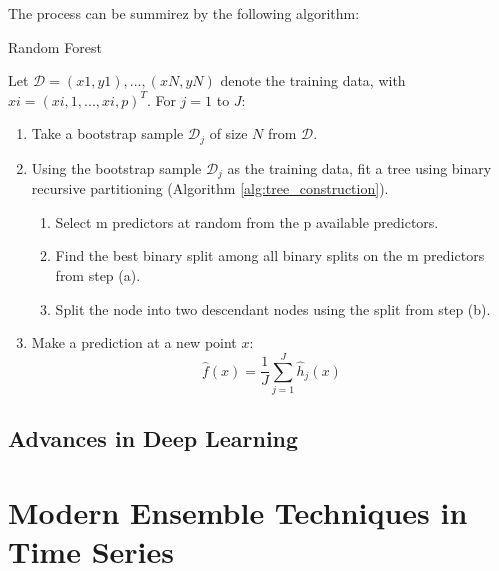 The process can be summirez by the following algorithm:
\begin{tcolorbox}[colback=blue!5, colframe=blue!80, boxrule=0pt]
    \begin{algorithm} [H]
        \caption{Random Forest}
        \label{alg:random_forest}
        Let $\mathscr{D} = {(x1, y1),...,(xN, yN)}$ denote the training data, with $xi = (xi,1,..., xi,p)^T$. 
        For $j = 1$ to $J$:
        \begin{enumerate}
            \item Take a bootstrap sample $\mathscr{D}_j$ of size $N$ from $\mathscr{D}$.
            \item Using the bootstrap sample $\mathscr{D}_j$ as the training data, fit a tree using binary recursive partitioning (Algorithm \ref{alg:tree_construction}).
            \begin{enumerate}
                \item Select m predictors at random from the p available predictors.
                \item Find the best binary split among all binary splits on the m predictors from step (a).
                \item Split the node into two descendant nodes using the split from step (b).
            \end{enumerate}
            \item Make a prediction at a new point $x$: 
            \[
                \hat{f}(x) = \frac{1}{J} \sum_{j=1}^{J} \hat{h}_j(x)
            \]
        \end{enumerate}
    \end{algorithm}
\end{tcolorbox}

\subsubsection{}


\subsection{Advances in Deep Learning} %

\section{Modern Ensemble Techniques in Time Series} %
\label{Sec: ensemble learning}

